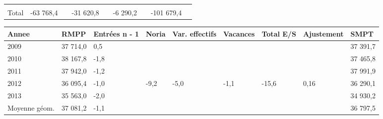 \begin{longtable}[]{@{}lllllllll@{}}
\begin{minipage}[t]{0.06\columnwidth}
\strut
\end{minipage} & \begin{minipage}[t]{0.12\columnwidth}\raggedright
\strut
\end{minipage} & \begin{minipage}[t]{0.06\columnwidth}\raggedright
\strut
\end{minipage} & \begin{minipage}[t]{0.09\columnwidth}\raggedright
\strut
\end{minipage} & \begin{minipage}[t]{0.06\columnwidth}\raggedright
\strut
\end{minipage}\tabularnewline
\begin{minipage}[t]{0.05\columnwidth}\raggedright
Total\strut
\end{minipage} & \begin{minipage}[t]{0.10\columnwidth}\raggedright
-63 768,4\strut
\end{minipage} & \begin{minipage}[t]{0.06\columnwidth}\raggedright
\strut
\end{minipage} & \begin{minipage}[t]{0.16\columnwidth}\raggedright
-31 620,8\strut
\end{minipage} & \begin{minipage}[t]{0.06\columnwidth}\raggedright
\strut
\end{minipage} & \begin{minipage}[t]{0.12\columnwidth}\raggedright
-6 290,2\strut
\end{minipage} & \begin{minipage}[t]{0.06\columnwidth}\raggedright
\strut
\end{minipage} & \begin{minipage}[t]{0.09\columnwidth}\raggedright
-101 679,4\strut
\end{minipage} & \begin{minipage}[t]{0.06\columnwidth}\raggedright
\strut
\end{minipage}\tabularnewline
\bottomrule
\end{longtable}

\begin{longtable}[]{@{}lllllllll@{}}
\toprule
Annee & RMPP & Entrées n - 1 & Noria & Var. effectifs & Vacances & Total
E/S & Ajustement & SMPT\tabularnewline
\midrule
\endhead
2009 & 37 714,0 & 0,5 & & & & & & 37 391,7\tabularnewline
2010 & 38 167,8 & -1,8 & & & & & & 37 465,8\tabularnewline
2011 & 37 942,0 & -1,2 & & & & & & 37 991,9\tabularnewline
2012 & 36 095,4 & -1,0 & -9,2 & -5,0 & -1,1 & -15,6 & 0,16 & 36
290,1\tabularnewline
2013 & 35 563,0 & -2,0 & & & & & & 34 930,2\tabularnewline
Moyenne géom. & 37 081,2 & -1,1 & & & & & & 36 797,5\tabularnewline
\bottomrule
\end{longtable}

